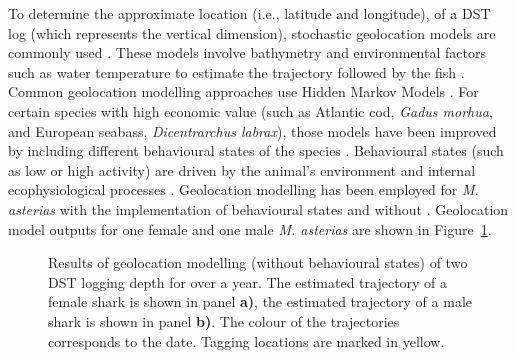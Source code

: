 \documentclass[
  authoryear,
  review,
  3p]{elsarticle}
\begin{document}
To determine the approximate location (i.e., latitude and longitude), of
a DST log (which represents the vertical dimension), stochastic
geolocation models are commonly used \citep{gatti_2021}. These models
involve bathymetry and environmental factors such as water temperature
to estimate the trajectory followed by the fish \citep{nielsen_2004}.
Common geolocation modelling approaches use Hidden Markov Models
\citep[HMM,][]{pedersen_2008, woillez_2016}. For certain species with
high economic value (such as Atlantic cod, \emph{Gadus morhua}, and
European seabass, \emph{Dicentrarchus labrax}), those models have been
improved by including different behavioural states of the species
\citep{pedersen_2008, heerah_2017}. Behavioural states (such as low or
high activity) are driven by the animal's environment and internal
ecophysiological processes \citep{gurarie_2016}. Geolocation modelling
has been employed for \emph{M. asterias} with the implementation of
behavioural states \citep[following the approach of][]{pedersen_2008}
and without \citep[following the approach of
\citet{woillez_2016}]{goossens_2023}. Geolocation model outputs for one
female and one male \emph{M. asterias} are shown in
Figure~\ref{fig-mapgeolocation}.

\begin{figure}

\begin{minipage}[t]{\linewidth}

{\centering 


}

\end{minipage}%
\newline
\begin{minipage}[t]{\linewidth}

{\centering 


}

\end{minipage}%

\caption{\label{fig-mapgeolocation}Results of geolocation modelling
(without behavioural states) of two DST logging depth for over a year.
The estimated trajectory of a female shark is shown in panel
\textbf{a)}, the estimated trajectory of a male shark is shown in panel
\textbf{b)}. The colour of the trajectories corresponds to the date.
Tagging locations are marked in yellow.}

\end{figure}
\end{document}
